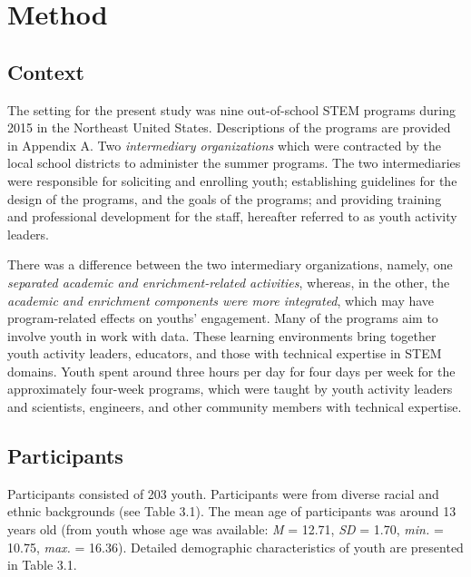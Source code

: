 \documentclass[]{book}
\theoremstyle{definition}
\theoremstyle{definition}
\theoremstyle{definition}
\theoremstyle{remark}
\begin{document}
\chapter{Method}\label{method}

\section{Context}\label{context}

The setting for the present study was nine out-of-school STEM programs
during 2015 in the Northeast United States. Descriptions of the programs
are provided in Appendix A. Two \emph{intermediary organizations} which
were contracted by the local school districts to administer the summer
programs. The two intermediaries were responsible for soliciting and
enrolling youth; establishing guidelines for the design of the programs,
and the goals of the programs; and providing training and professional
development for the staff, hereafter referred to as youth activity
leaders.

There was a difference between the two intermediary organizations,
namely, one \emph{separated academic and enrichment-related activities},
whereas, in the other, the \emph{academic and enrichment components were
more integrated}, which may have program-related effects on youths'
engagement. Many of the programs aim to involve youth in work with data.
These learning environments bring together youth activity leaders,
educators, and those with technical expertise in STEM domains. Youth
spent around three hours per day for four days per week for the
approximately four-week programs, which were taught by youth activity
leaders and scientists, engineers, and other community members with
technical expertise.

\section{Participants}\label{participants}

Participants consisted of 203 youth. Participants were from diverse
racial and ethnic backgrounds (see Table 3.1). The mean age of
participants was around 13 years old (from youth whose age was
available: \emph{M} = 12.71, \emph{SD} = 1.70, \emph{min.} = 10.75,
\emph{max.} = 16.36). Detailed demographic characteristics of youth are
presented in Table 3.1.
\end{document}
